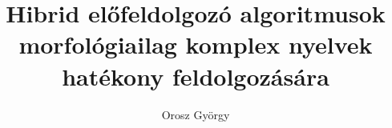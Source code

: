 \author{Orosz György}
\title{Hibrid előfeldolgozó algoritmusok morfológiailag komplex nyelvek hatékony feldolgozására}

\newcommand{\mytitle}{Hibrid előfeldolgozó algoritmusok morfológiailag komplex nyelvek hatékony feldolgozására}
\newcommand{\myauthor}{Orosz György}
\newcommand{\myuniversity}{Pázmány Péter Katolikus Egyetem\\
Információs Technológiai és Bionikai kar\\
Multidiszciplináris Műszaki Tudományok Doktori Iskola}
\newcommand{\mydegree}{PhD disszertáció tézisfüzete}
\newcommand{\mysupervisor}{Témavezető:\\
\textbf{Gábor Prószéky, DSc}
}
\newcommand{\mydate}{Budapest, 2014}

